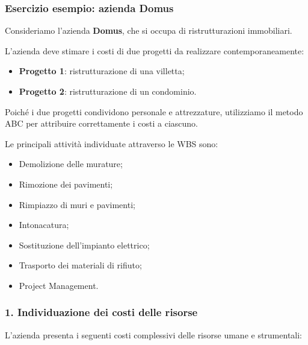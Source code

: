 \subsubsection*{Esercizio esempio: azienda Domus}

\noindent Consideriamo l'azienda \textbf{Domus},
che si occupa di ristrutturazioni immobiliari.

\noindent L'azienda deve stimare i costi
di due progetti da realizzare contemporaneamente:

\begin{itemize}
    \item \textbf{Progetto 1}: ristrutturazione
    di una villetta;

    \item \textbf{Progetto 2}: ristrutturazione
    di un condominio.
\end{itemize}

\noindent Poiché i due progetti condividono
personale e attrezzature, utilizziamo
il metodo ABC per attribuire correttamente
i costi a ciascuno.

\medskip

\noindent Le principali attività individuate
attraverso le WBS sono:

\begin{itemize}
    \item Demolizione delle murature;
    \item Rimozione dei pavimenti;
    \item Rimpiazzo di muri e pavimenti;
    \item Intonacatura;
    \item Sostituzione dell'impianto elettrico;
    \item Trasporto dei materiali di rifiuto;
    \item Project Management.
\end{itemize}

\subsubsection*{1. Individuazione dei costi delle risorse}

\noindent L'azienda presenta i seguenti costi
complessivi delle risorse umane e strumentali:

